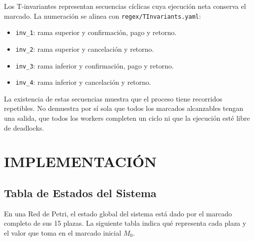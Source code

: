 \documentclass[11pt,a4paper]{article}
\begin{document}
Los T-invariantes representan secuencias cíclicas cuya ejecución neta conserva
el marcado. La numeración se alinea con \texttt{regex/TInvariants.yaml}:

\begin{itemize}
    \item \texttt{inv\_1}: rama superior y confirmación, pago y retorno.
    \item \texttt{inv\_2}: rama superior y cancelación y retorno.
    \item \texttt{inv\_3}: rama inferior y confirmación, pago y retorno.
    \item \texttt{inv\_4}: rama inferior y cancelación y retorno.
\end{itemize}

La existencia de estas secuencias muestra que el proceso tiene recorridos
repetibles. No demuestra por sí sola que todos los marcados alcanzables tengan
una salida, que todos los workers completen un ciclo ni que la ejecución esté
libre de deadlocks.

\section{IMPLEMENTACIÓN}

\subsection{Tabla de Estados del Sistema}

En una Red de Petri, el estado global del sistema está dado por el marcado
completo de sus 15 plazas. La siguiente tabla indica qué representa cada plaza
y el valor que toma en el marcado inicial $M_0$.
\end{document}
